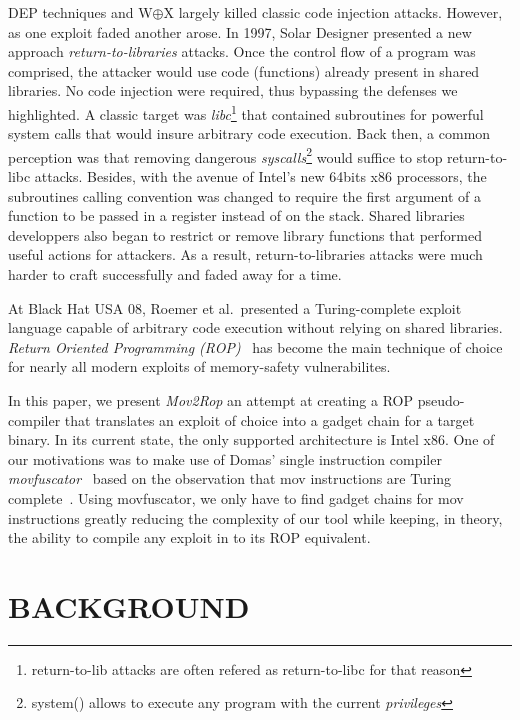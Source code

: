 \documentclass[10pt,twocolumn]{article}
\begin{document}
DEP techniques and W$\oplus$X largely killed classic code injection attacks.
However, as one exploit faded another arose. In 1997, Solar Designer presented
a new approach \textit{return-to-libraries}\cite{solar_returnintolib_1997}
attacks. Once the control flow of a program was comprised, the attacker would
use code (functions) already present in shared libraries. No code injection
were required, thus bypassing the defenses we highlighted. A classic target was
\textit{libc}\footnote{return-to-lib attacks are often refered as
return-to-libc for that reason} that contained subroutines for powerful
system calls that would insure arbitrary code execution. Back then, a
common perception was that removing dangerous
\textit{syscalls}\footnote{system() allows to execute any program with the
current \textit{privileges}} would suffice to stop return-to-libc attacks.
Besides, with the avenue of Intel's new 64bits x86 processors, the
subroutines calling convention was changed to require the first argument of
a function to be passed in a register instead of on the stack. Shared
libraries developpers also began to restrict or remove library functions
that performed useful actions for attackers. As a result,
return-to-libraries attacks were much harder to craft successfully and
faded away for a time.

At Black Hat USA 08, Roemer et al.\  presented a Turing-complete exploit
language capable of arbitrary code execution without relying on shared
libraries. \textit{Return Oriented Programming
(ROP)}~\cite{roemer_return-oriented_2012} has become the main technique of
choice for nearly all modern exploits of memory-safety vulnerabilites.

In this paper, we present \textit{Mov2Rop} an attempt at creating a ROP
pseudo-compiler that translates an exploit of choice into a gadget chain for a
target binary. In its current state, the only supported architecture is Intel
x86. One of our motivations was to make use of Domas' single instruction
compiler \textit{movfuscator}~\cite{domas_movfuscator} based on the observation
that mov instructions are Turing complete~\cite{dolan_mov_2013}. Using
movfuscator, we only have to find gadget chains for mov instructions greatly
reducing the complexity of our tool while keeping, in theory, the ability to
compile any exploit in to its ROP equivalent.


\section{BACKGROUND}
\end{document}
